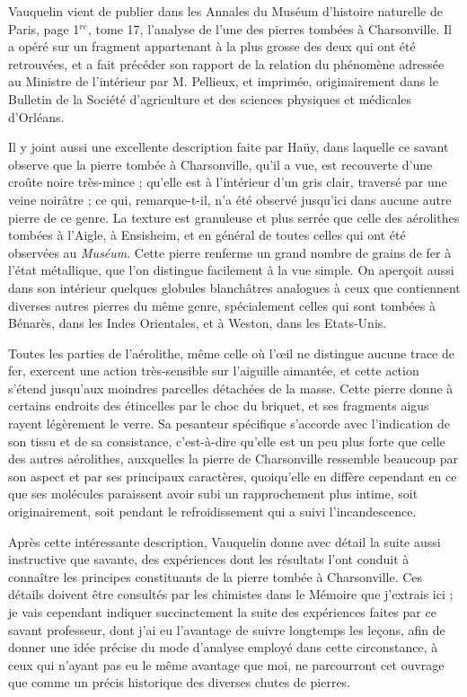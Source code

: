 \documentclass[a4paper, 12pt, oneside, french]{article}
\begin{document}
Vauquelin vient de publier dans les Annales du Muséum d'histoire naturelle de Paris, page 1$^{re}$, tome 17, l'analyse de l'une des pierres tombées à Charsonville. Il a opéré sur un fragment appartenant à la plus grosse des deux qui ont été retrouvées, et a fait précéder son rapport de la relation du phénomène adressée au Ministre de l'intérieur par M. Pellieux, et imprimée, originairement dans le Bulletin de la Société d'agriculture et des sciences physiques et médicales d'Orléans.

Il y joint aussi une excellente description faite par Haüy, dans laquelle ce savant observe que la pierre tombée à Charsonville, qu'il a vue, est recouverte d'une croûte noire très-mince ; qu'elle est à l'intérieur d'un gris clair, traversé par une veine noirâtre ; ce qui, remarque-t-il, n'a été observé jusqu'ici dans aucune autre pierre de ce genre. La texture est granuleuse et plus serrée que celle des aérolithes tombées à l'Aigle, à Ensisheim, et en général de toutes celles qui ont été observées au \emph{Muséum}. Cette pierre renferme un grand nombre de grains de fer à l'état métallique, que l'on distingue facilement à la vue simple. On aperçoit aussi dans son intérieur quelques globules blanchâtres analogues à ceux que contiennent diverses autres pierres du même genre, spécialement celles qui sont tombées à Bénarès, dans les Indes Orientales, et à Weston, dans les Etats-Unis.

Toutes les parties de l'aérolithe, même celle où l'œil ne distingue aucune trace de fer, exercent une action très-sensible sur l'aiguille aimantée, et cette action s'étend jusqu'aux moindres parcelles détachées de la masse. Cette pierre donne à certains endroits des étincelles par le choc du briquet, et ses fragments aigus rayent légèrement le verre. Sa pesanteur spécifique s'accorde avec l'indication de son tissu et de sa consistance, c'est-à-dire qu'elle est un peu plus forte que celle des autres aérolithes, auxquelles la pierre de Charsonville ressemble beaucoup par son aspect et par ses principaux caractères, quoiqu’elle en diffère cependant en ce que ses molécules paraissent avoir subi un rapprochement plus intime, soit originairement, soit pendant le refroidissement qui a suivi l'incandescence.

Après cette intéressante description, Vauquelin donne avec détail la suite aussi instructive que savante, des expériences dont les résultats l'ont conduit à connaître les principes constituants de la pierre tombée à Charsonville. Ces détails doivent être consultés par les chimistes dans le Mémoire que j'extrais ici ; je vais cependant indiquer succinctement la suite des expériences faites par ce savant professeur, dont j'ai eu l'avantage de suivre longtemps les leçons, afin de donner une idée précise du mode d'analyse employé dans cette circonstance, à ceux qui n'ayant pas eu le même avantage que moi, ne parcourront cet ouvrage que comme un précis historique des diverses chutes de pierres.
\end{document}
